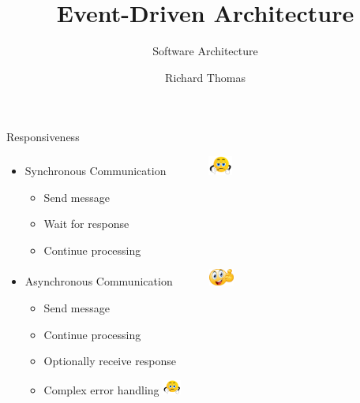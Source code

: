 \documentclass{slide}
\title{Event-Driven Architecture}
\subtitle{Software Architecture}
\author{Richard Thomas}
\date{\week{6}}
\begin{document}
\maketitle




\begin{frame}{Responsiveness}
    \vspace{1mm}
    {\LARGE
    \begin{itemize}
        \item Synchronous Communication ~~~~~~~\includegraphics[trim=22 19 22 12,clip,width=8mm]{../../shared/images/thumbs-down.png}
        \begin{itemize}
            \Large\item Send message
            \Large\item Wait for response
            \Large\item Continue processing
	\end{itemize}
        \vspace{3mm}
        \item Asynchronous Communication ~~~~~~\includegraphics[width=8mm]{../../shared/images/thumbs-up.png}
        \begin{itemize}
            \Large\item Send message
            \Large\item Continue processing
            \Large\item Optionally receive response
            \Large\item Complex error handling \tabto{16em}\includegraphics[trim=22 19 22 12,clip,width=6mm]{../../shared/images/thumbs-down.png}
	\end{itemize}
    \end{itemize}
    }
\end{frame}
\end{document}

